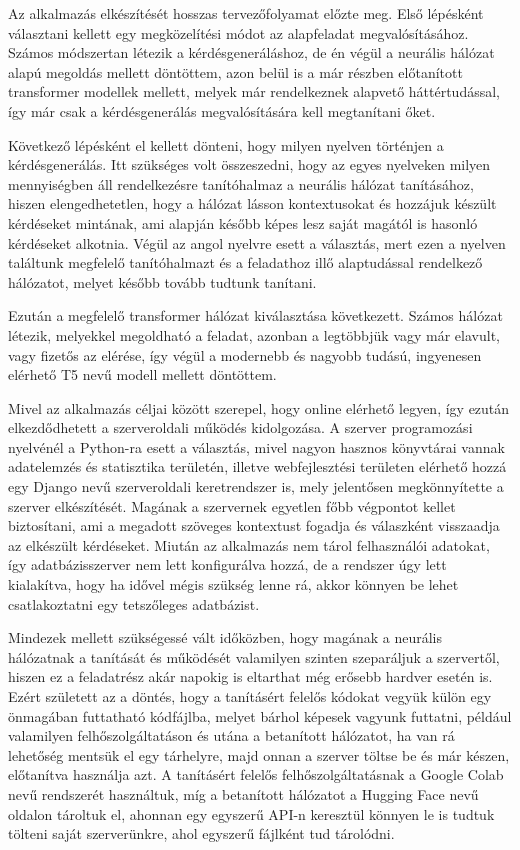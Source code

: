 
Az alkalmazás elkészítését hosszas tervezőfolyamat előzte meg. Első lépésként választani kellett egy megközelítési módot az alapfeladat megvalósításához. Számos módszertan létezik a kérdésgeneráláshoz, de én végül a neurális hálózat alapú megoldás mellett döntöttem, azon belül is a már részben előtanított transformer modellek mellett, melyek már rendelkeznek alapvető háttértudással, így már csak a kérdésgenerálás megvalósítására kell megtanítani őket.

Következő lépésként el kellett dönteni, hogy milyen nyelven történjen a kérdésgenerálás. Itt szükséges volt összeszedni, hogy az egyes nyelveken milyen mennyiségben áll rendelkezésre tanítóhalmaz a neurális hálózat tanításához, hiszen elengedhetetlen, hogy a hálózat lásson kontextusokat és hozzájuk készült kérdéseket mintának, ami alapján később képes lesz saját magától is hasonló kérdéseket alkotnia. Végül az angol nyelvre esett a választás, mert ezen a nyelven találtunk megfelelő tanítóhalmazt és a feladathoz illő alaptudással rendelkező hálózatot, melyet később tovább tudtunk tanítani.

Ezután a megfelelő transformer hálózat kiválasztása következett. Számos hálózat létezik, melyekkel megoldható a feladat, azonban a legtöbbjük vagy már elavult, vagy fizetős az elérése, így végül a modernebb és nagyobb tudású, ingyenesen elérhető T5 nevű modell mellett döntöttem.

Mivel az alkalmazás céljai között szerepel, hogy online elérhető legyen, így ezután elkezdődhetett a szerveroldali működés kidolgozása. A szerver programozási nyelvénél a Python-ra esett a választás, mivel nagyon hasznos könyvtárai vannak adatelemzés és statisztika területén, illetve webfejlesztési területen elérhető hozzá egy Django nevű szerveroldali keretrendszer is, mely jelentősen megkönnyítette a szerver elkészítését. Magának a szervernek egyetlen főbb végpontot kellet biztosítani, ami a megadott szöveges kontextust fogadja és válaszként visszaadja az elkészült kérdéseket. Miután az alkalmazás nem tárol felhasználói adatokat, így adatbázisszerver nem lett konfigurálva hozzá, de a rendszer úgy lett kialakítva, hogy ha idővel mégis szükség lenne rá, akkor könnyen be lehet csatlakoztatni egy tetszőleges adatbázist. 

Mindezek mellett szükségessé vált időközben, hogy magának a neurális hálózatnak a tanítását és működését valamilyen szinten szeparáljuk a szervertől, hiszen ez a feladatrész akár napokig is eltarthat még erősebb hardver esetén is. Ezért született az a döntés, hogy a tanításért felelős kódokat vegyük külön egy önmagában futtatható kódfájlba, melyet bárhol képesek vagyunk futtatni, például valamilyen felhőszolgáltatáson és utána a betanított hálózatot, ha van rá lehetőség mentsük el egy tárhelyre, majd onnan a szerver töltse be és már készen, előtanítva használja azt. A tanításért felelős felhőszolgáltatásnak a Google Colab nevű rendszerét használtuk, míg a betanított hálózatot a Hugging Face nevű oldalon tároltuk el, ahonnan egy egyszerű API-n keresztül könnyen le is tudtuk tölteni saját szerverünkre, ahol egyszerű fájlként tud tárolódni.

